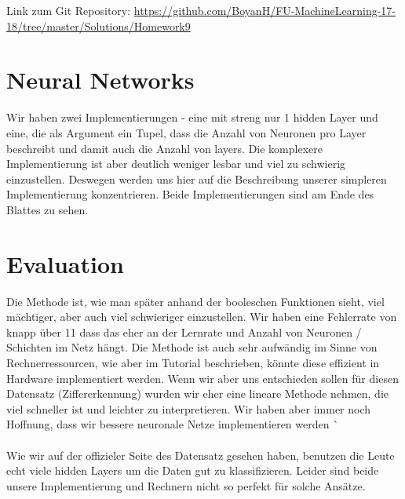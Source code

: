 \usepackage{graphicx}
\usepackage{amsmath}
\usepackage{amssymb}
\usepackage{fancyvrb}

\newcommand{\dozent}{Prof. R. Rojas}					%
\newcommand{\projectNo}{9}
\newcommand{\veranstaltung}{Mustererkennung}
\newcommand{\semester}{WS17/18}
\newcommand{\studenten}{Boyan Hristov, Nedeltscho Petrov}





Link zum Git Repository: \url{https://github.com/BoyanH/FU-MachineLearning-17-18/tree/master/Solutions/Homework\projectNo}

\section*{Neural Networks}
Wir haben zwei Implementierungen - eine mit streng nur 1 hidden Layer und eine, die als Argument ein Tupel, dass
die Anzahl von Neuronen pro Layer beschreibt und damit auch die Anzahl von layers. Die komplexere Implementierung
ist aber deutlich weniger lesbar und viel zu schwierig einzustellen.
Deswegen werden uns hier auf die Beschreibung unserer simpleren Implementierung konzentrieren. Beide Implementierungen
sind am Ende des Blattes zu sehen.

\section*{Evaluation}
Die Methode ist, wie man später anhand der booleschen Funktionen sieht, viel mächtiger, aber auch viel schwieriger
einzustellen. Wir haben eine Fehlerrate von knapp über 11%
dass das eher an der Lernrate und Anzahl von Neuronen / Schichten im Netz hängt. Die Methode ist auch sehr aufwändig
im Sinne von Rechnerressourcen, wie aber im Tutorial beschrieben, könnte diese effizient in Hardware implementiert
werden. Wenn wir aber uns entschieden sollen für diesen Datensatz (Ziffererkennung) wurden wir eher eine lineare
Methode nehmen, die viel schneller ist und leichter zu interpretieren. Wir haben aber immer noch Hoffnung, dass wir
bessere neuronale Netze implementieren werden ^^ \\ \\

Wie wir auf der offizieler Seite des Datensatz gesehen haben, benutzen die Leute echt viele hidden Layers um die
Daten gut zu klassifizieren. Leider sind beide unsere Implementierung und Rechnern nicht so perfekt für solche
Ansätze.

